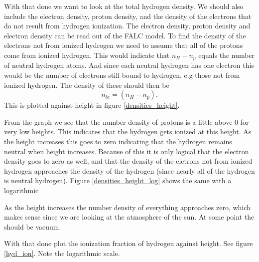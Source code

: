 \documentclass{aa}   %
\begin{document}
With that done we want to look at the total hydrogen density. We should also include the electron density, proton density, and the density of the electrons that do not result from hydrogen ionization. The electron density, proton density and electron density can be read out of the FALC model. To find the density of the electrons not from ionized hydrogen we need to assume that all of the protons come from ionized hydrogen. This would indicate that $n_H - n_p$ equals the number of neutral hydrogen atoms. And since each neutral hydrogen has one electron this would be the number of electrons still bound to hydrogen, e.g those not from ionized hydrogen. The density of these should then be
\begin{equation}
 n_{be} = (n_H - n_p).
\end{equation}
This is plotted against height in figure \ref{densities_height}. 

From the graph we see that the number density of protons is a little above 0 for very low heights. This indicates that the hydrogen gets ionized at this height. As the height increases this goes to zero indicating that the hydrogen remains neutral when height increases. Because of this it is only logical that the electron density goes to zero as well, and that the density of the elctrons not from ionized hydrogen approaches the density of the hydrogen (since nearly all of the hydrogen is neutral hydrogen). Figure \ref{densities_height_log} shows the same with a logarithmic

As the height increases the number density of everything approaches zero, which makes sense since we are looking at the atmosphere of the sun. At some point the should be vacuum.

With that done plot the ionization fraction of hydrogen against height. See figure \ref{hyd_ion}. Note the logarithmic scale.
\end{document}
